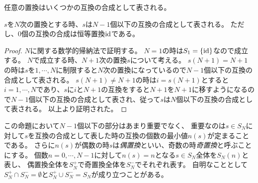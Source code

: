 任意の置換はいくつかの互換の合成として表される。

\begin{proposition}
$s$を$N$次の置換とする時、$s$は$N-1$個以下の互換の合成として表される。
ただし、$0$個の互換の合成は恒等置換$\mathrm{id}$である。
\end{proposition}

\begin{proof}
$N$に関する数学的帰納法で証明する。
$N = 1$の時は$S_1 = \{ \mathrm{id} \}$なので成立する。
$N$で成立する時、$N+1$次の置換$s$について考える。
$s(N+1) = N+1$の時は$s$を$1, \cdots, N$に制限すると$N$次の置換になっているので$N-1$個以下の互換の合成として表される。
$s(N+1) \ne N+1$の時は$i = s(N+1)$とすると$i = 1, \cdots, N$であり、$s$に$i$と$N+1$の互換をすると$N+1$を$N+1$に移すようになるので$N-1$個以下の互換の合成として表され、従って$s$は$N$個以下の互換の合成として表される。
以上より証明された。
\end{proof}

この命題において$N-1$個以下の部分はあまり重要でなく、
重要なのは$s \in S_N$に対して$s$を互換の合成として表した時の互換の個数の最小値$n(s)$が定まることである。
さらに$n(s)$が偶数の時$s$は\emph{偶置換}といい、奇数の時\emph{奇置換}と呼ぶことにする。
個数$n = 0, \cdots, N-1$に対して$n(s) = n$となる$s \in S_N$全体を$S_N(n)$と表し、
偶置換全体を$S_N^+$で奇置換全体を$S_N^-$でそれぞれ表す。
自明なこととして$S_N^+\cap S_N^- = \emptyset$と$S_N^+\cup S_N^- = S_N$が成り立つことがある。

